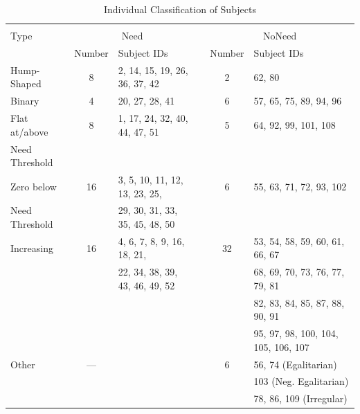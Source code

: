 \documentclass[12pt]{scrartcl}
\begin{document}
\clearpage
\begin{landscape}
\begin{table}[ht!]
   \centering
   \caption{Individual Classification of Subjects}\label{tab:classification}
   {\normalsize\small
   \begin{tabular}{lclccl}\hline\\[-1.5ex]
      Type             & \multicolumn{2}{c}{Need}                     &   & \multicolumn{2}{c}{NoNeed}                        \\\cline{2-3}\cline{5-6}
                       & Number   & Subject IDs                       &   & Number   & Subject IDs                            \\\hline\hline
      Hump-Shaped      &  8       &  2, 14, 15, 19, 26, 36, 37, 42    &   &  2       &  62, 80                                \\[1ex]
      Binary           &  4       &  20, 27, 28, 41                   &   &  6       &  57, 65, 75, 89, 94, 96                \\[1ex]
      Flat at/above    &  8       &  1, 17, 24, 32, 40, 44, 47, 51    &   &  5       &  64, 92, 99, 101, 108                  \\
      Need Threshold   &          &                                   &   &          &                                        \\[1ex]
      Zero below       & 16       &  3, 5, 10, 11, 12, 13, 23, 25,    &   &  6       &  55, 63, 71, 72, 93, 102               \\
      Need Threshold   &          &  29, 30, 31, 33, 35, 45, 48, 50   &   &          &                                        \\[1ex]
      Increasing       & 16       &  4, 6, 7, 8, 9, 16, 18, 21,       &   & 32       &  53, 54, 58, 59, 60, 61, 66, 67        \\
                       &          &  22, 34, 38, 39, 43, 46, 49, 52   &   &          &  68, 69, 70, 73, 76, 77, 79, 81        \\
                       &          &                                   &   &          &  82, 83, 84, 85, 87, 88, 90, 91        \\
                       &          &                                   &   &          &  95, 97, 98, 100, 104, 105, 106, 107   \\[1ex]
      Other            & ---      &                                   &   &  6       &  56, 74 (Egalitarian)                  \\
                       &          &                                   &   &          &  103 (Neg. Egalitarian)                \\
                       &          &                                   &   &          &  78, 86, 109 (Irregular)               \\\hline
   \end{tabular}}
\end{table}
\end{landscape}
\end{document}
